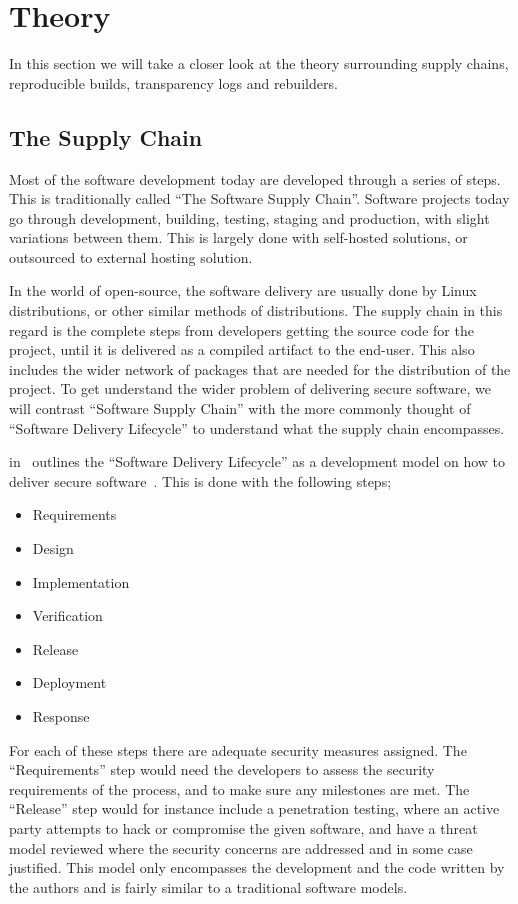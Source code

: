\documentclass[../Main/thesis.tex]{subfiles}
\begin{document}
\chapter{Theory}
\label{ch:theory}
In this section we will take a closer look at the theory surrounding
supply chains, reproducible builds, transparency logs and rebuilders.

\section{The Supply Chain}\label{sec:supply_chain}
Most of the software development today are developed through a series of steps.
This is traditionally called ``The Software Supply Chain''. Software projects
today go through development, building, testing, staging and production, with
slight variations between them. This is largely done with self-hosted solutions,
or outsourced to external hosting solution.

In the world of open-source, the software delivery are usually done by Linux
distributions, or other similar methods of distributions. The supply chain in
this regard is the complete steps from developers getting the source code for
the project, until it is delivered as a compiled artifact to the end-user. This
also includes the wider network of packages that are needed for the distribution
of the project. To get understand the wider problem of delivering secure
software, we will contrast ``Software Supply Chain'' with the more commonly
thought of ``Software Delivery Lifecycle'' to understand what the supply chain
encompasses.

\citeauthor{10.1109CSAC.2004.41} in~ outlines the
``Software Delivery Lifecycle'' as a development model on how to deliver secure
software~\cite{10.1109CSAC.2004.41}. This is done with the following steps;

\begin{itemize}
    \item Requirements
    \item Design
    \item Implementation
    \item Verification 
    \item Release
    \item Deployment
    \item Response
\end{itemize}

For each of these steps there are adequate security measures assigned. The
``Requirements'' step would need the developers to assess the security
requirements of the process, and to make sure any milestones are met. The
``Release'' step would for instance include a penetration testing, where an
active party attempts to hack or compromise the given software, and have a
threat model reviewed where the security concerns are addressed and in some case
justified. This model only encompasses the development and the code written by
the authors and is fairly similar to a traditional software models. 
\end{document}
